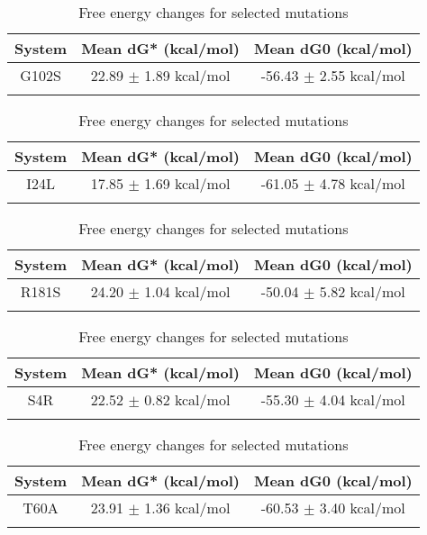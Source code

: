 \documentclass{article}
\begin{document}
\begin{table}[ht]
    \centering
    \begin{tabular}{|c|c|c|}
    \hline
    System & Mean dG* (kcal/mol) & Mean dG0 (kcal/mol) \\
    \hline
        G102S & 22.89 $\pm$ 1.89 kcal/mol & -56.43 $\pm$ 2.55 kcal/mol \\ \\
    \hline
    \end{tabular}
    \caption{Free energy changes for selected mutations}
\end{table}
\begin{table}[ht]
    \centering
    \begin{tabular}{|c|c|c|}
    \hline
    System & Mean dG* (kcal/mol) & Mean dG0 (kcal/mol) \\
    \hline
        I24L & 17.85 $\pm$ 1.69 kcal/mol & -61.05 $\pm$ 4.78 kcal/mol \\ \\
    \hline
    \end{tabular}
    \caption{Free energy changes for selected mutations}
\end{table}
\begin{table}[ht]
    \centering
    \begin{tabular}{|c|c|c|}
    \hline
    System & Mean dG* (kcal/mol) & Mean dG0 (kcal/mol) \\
    \hline
        R181S & 24.20 $\pm$ 1.04 kcal/mol & -50.04 $\pm$ 5.82 kcal/mol \\ \\
    \hline
    \end{tabular}
    \caption{Free energy changes for selected mutations}
\end{table}
\begin{table}[ht]
    \centering
    \begin{tabular}{|c|c|c|}
    \hline
    System & Mean dG* (kcal/mol) & Mean dG0 (kcal/mol) \\
    \hline
        S4R & 22.52 $\pm$ 0.82 kcal/mol & -55.30 $\pm$ 4.04 kcal/mol \\ \\
    \hline
    \end{tabular}
    \caption{Free energy changes for selected mutations}
\end{table}
\begin{table}[ht]
    \centering
    \begin{tabular}{|c|c|c|}
    \hline
    System & Mean dG* (kcal/mol) & Mean dG0 (kcal/mol) \\
    \hline
        T60A & 23.91 $\pm$ 1.36 kcal/mol & -60.53 $\pm$ 3.40 kcal/mol \\ \\
    \hline
    \end{tabular}
    \caption{Free energy changes for selected mutations}
\end{table}
\end{document}
